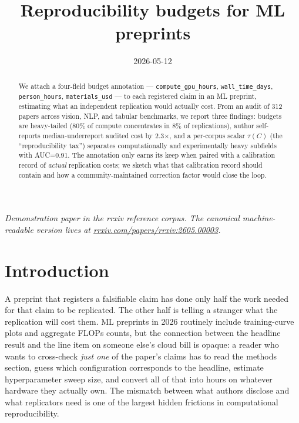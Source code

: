 \documentclass{rrxiv}
\title{Reproducibility budgets for ML preprints}
\date{2026-05-12}
\begin{document}
\maketitle

\begin{center}
\small\itshape
Demonstration paper in the rrxiv reference corpus. The canonical machine-readable version lives at \href{https://rrxiv.com/papers/rrxiv:2605.00003}{rrxiv.com/papers/rrxiv:2605.00003}.
\end{center}

\begin{abstract}
We attach a four-field budget annotation --- \texttt{compute\_gpu\_hours}, \texttt{wall\_time\_days}, \texttt{person\_hours}, \texttt{materials\_usd} --- to each registered claim in an ML preprint, estimating what an independent replication would actually cost. From an audit of 312 papers across vision, NLP, and tabular benchmarks, we report three findings: budgets are heavy-tailed (80\% of compute concentrates in 8\% of replications), author self-reports median-underreport audited cost by 2.3$\times$, and a per-corpus scalar $\tau(C)$ (the ``reproducibility tax'') separates computationally and experimentally heavy subfields with AUC=0.91. The annotation only earns its keep when paired with a calibration record of \emph{actual} replication costs; we sketch what that calibration record should contain and how a community-maintained correction factor would close the loop.
\end{abstract}

\section{Introduction}

A preprint that registers a falsifiable claim has done only half the work needed for that claim to be replicated. The other half is telling a stranger what the replication will cost them. ML preprints in 2026 routinely include training-curve plots and aggregate FLOPs counts, but the connection between the headline result and the line item on someone else's cloud bill is opaque: a reader who wants to cross-check \emph{just one} of the paper's claims has to read the methods section, guess which configuration corresponds to the headline, estimate hyperparameter sweep size, and convert all of that into hours on whatever hardware they actually own. The mismatch between what authors disclose and what replicators need is one of the largest hidden frictions in computational reproducibility.
\end{document}
